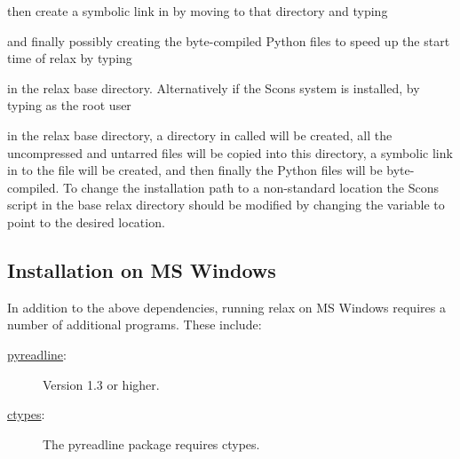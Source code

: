 
then create a symbolic link in  by moving to that directory and typing


and finally possibly creating the byte-compiled Python  files to speed up the start time of relax by typing


in the relax base directory.  Alternatively if the Scons system is installed, by typing as the root user


in the relax base directory, a directory in  called  will be created, all the uncompressed and untarred files will be copied into this directory, a symbolic link in  to the file  will be created, and then finally the Python  files will be byte-compiled.  To change the installation path to a non-standard location the Scons script  in the base relax directory should be modified by changing the variable  to point to the desired location.



\subsection{Installation on MS Windows}

In addition to the above dependencies, running relax on MS Windows requires a number of additional programs.  These include:

\begin{description}
\item[\href{http://projects.scipy.org/ipython/ipython/wiki/PyReadline/Intro}{pyreadline}:]  Version 1.3 or higher.
\item[\href{http://starship.python.net/crew/theller/ctypes/}{ctypes}:]  The pyreadline package requires ctypes.
\end{description}

